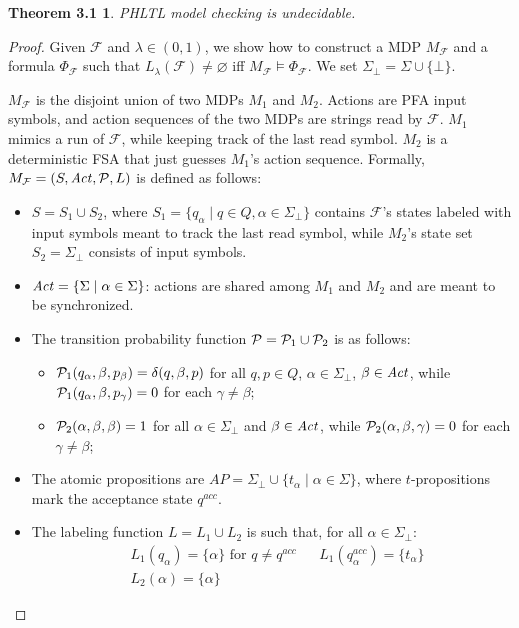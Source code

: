 \newtheorem*{theorem-undec}{Theorem 3.1}
\begin{theorem-undec}
    \acs{PHLTL} model checking is undecidable.
\end{theorem-undec}
\begin{proof}
Given $\mathcal{F}$ and $\lambda \in (0,1)$, we show how to construct 
a \ac{MDP} $M_\mathcal{F}$ and a formula $\Phi_\mathcal{F}$ such that 
$L_{\lambda}(\mathcal{F}) \neq \varnothing$ iff $M_\mathcal{F} \models \Phi_\mathcal{F}$.
We set $\Sigma_{\bot} = \Sigma \cup \{ \bot \}$.

$M_\mathcal{F}$ is the disjoint union of two \acp{MDP} $M_1$ and $M_2$.
Actions are \ac{PFA} input symbols, and action sequences of the two \acp{MDP} are strings read by $\mathcal{F}$.
$M_1$ mimics a run of $\mathcal{F}$, while keeping track of the last read symbol.
$M_2$ is a deterministic \ac{FSA} that just guesses $M_1$'s action sequence.
Formally, $M_\mathcal{F} = (S, \mathit{Act}, \mathcal{P}, L)$ is defined as follows: 
\begin{itemize}
    \item %
      $S = S_1 \cup S_2$,
      where $S_1 = \{ q_{\alpha} \mid q \in Q, \alpha \in \Sigma_{\bot} \}$
      contains $\mathcal{F}$'s states labeled with input symbols meant to track the last read symbol,
      while $M_2$'s state set $S_2 = \Sigma_{\bot}$
      consists of input symbols.
    \item $\mathit{Act} = \{ \Sigma \mid \alpha \in \Sigma \}$:
      actions are shared among $M_1$ and $M_2$ and are meant to be synchronized. 
    \item The transition probability function $\mathcal{P} = \mathcal{P}_1 \cup \mathcal{P}_2$ is as follows:
    \begin{itemize}
        \item $\mathcal{P}_1(q_\alpha, \beta, p_{\beta}) = \delta(q, \beta, p)$
            for all $q,p \in Q$, $\alpha \in \Sigma_{\bot}$, $\beta \in \mathit{Act}$,
            while $\mathcal{P}_1(q_\alpha, \beta, p_{\gamma}) = 0$ for each $\gamma \neq \beta$;
        \item $\mathcal{P}_2(\alpha, \beta, \beta) = 1$
            for all $\alpha \in \Sigma_{\bot}$ and $\beta \in \mathit{Act}$,
            while $\mathcal{P}_2(\alpha, \beta, \gamma) = 0$
            for each $\gamma \neq \beta$;
    \end{itemize}  
    \item The atomic propositions are $AP = \Sigma_{\bot} \cup \{ t_{\alpha} \mid \alpha \in \Sigma \}$,
        where $t$-propositions mark the acceptance state $q^\mathit{acc}$.
    \item The labeling function $L = L_1 \cup L_2$ is such that, for all $\alpha \in \Sigma_{\bot}$:
        \begin{align*}
            &L_1(q_{\alpha}) = \{ \alpha \} \text{ for $q \neq q^\mathit{acc}$} &
            &L_1(q^\mathit{acc}_{\alpha}) = \{t_\alpha \} \\
            &L_2(\alpha) = \{ \alpha \} &
            &
        \end{align*}
\end{itemize}


\end{proof}
